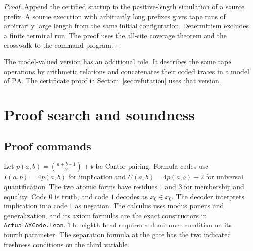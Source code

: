 \documentclass[11pt,letterpaper]{article}
\newcommand{\PA}{\mathrm{PA}}
\newcommand{\src}[2]{\href{https://github.com/jamesyc/BusyBeaver/blob/main/#1}{\texttt{\nolinkurl{#2}}}}
\begin{document}
\begin{proof}
Append the certified startup to the positive-length simulation of a
source prefix. A source execution with arbitrarily long prefixes gives
tape runs of arbitrarily large length from the same initial
configuration. Determinism excludes a finite terminal run. The proof
uses the all-site coverage theorem and the crosswalk to the command
program.
\end{proof}

The model-valued version has an additional role. It describes the same
tape operations by arithmetic relations and concatenates their coded
traces in a model of $\PA$. The certificate proof in
Section~\ref{sec:refutation} uses that version.

\section{Proof search and soundness}\label{sec:commands}

\subsection{Proof commands}

Let $p(a,b)=\binom{a+b+1}{2}+b$ be Cantor pairing. Formula codes use
$I(a,b)=4p(a,b)$ for implication and $U(a,b)=4p(a,b)+2$ for
universal quantification. The two atomic forms have residues $1$ and
$3$ for membership and equality. Code $0$ is truth, and code $1$
decodes as $x_0\in x_0$. The decoder interprets implication into
code $1$ as negation. The calculus uses modus ponens and
generalization, and its axiom formulas are the exact constructors in
\src{M6/Source/ActualAXCode.lean}{ActualAXCode.lean}. The eighth head
requires a dominance condition on its fourth parameter. The
separation formula at the gate has the two indicated freshness
conditions on the third variable.
\end{document}
